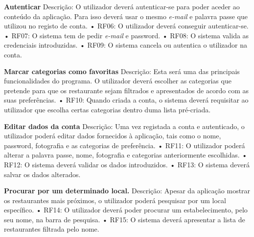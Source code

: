 \documentclass[a4paper,12pt]{scrreprt}
\begin{document}
             
            \textbf{Autenticar} \newline
            Descrição: O utilizador deverá autenticar-se para poder aceder ao conteúdo da aplicação. Para isso deverá usar o mesmo  \textit{e-mail} e palavra passe que utilizou no registo de conta. \newline
            • RF06: O utilizador deverá conseguir autenticar-se.\newline
            • RF07: O sistema tem de pedir \textit{e-mail} e password.\newline
            • RF08: O sistema valida as credenciais introduzidas.\newline
            • RF09: O sistema cancela ou autentica o utilizador na conta.\newline
            
            \textbf{Marcar categorias como favoritas} \newline
            Descrição: Esta será uma das principais funcionalidades do programa. O utilizador deverá escolher as categorias que pretende para que os restaurante sejam filtrados e apresentados de acordo com as suas preferências.\newline
            • RF10: Quando criada a conta, o sistema deverá requisitar ao utilizador que escolha certas categorias dentro duma lista pré-criada.\newline
            
            \textbf{Editar dados da conta} \newline
            Descrição: Uma vez registada a conta e autenticado, o utilizador poderá editar dados fornecidos à aplicação, tais como o nome, password, fotografia e as categorias de preferência. \newline
            • RF11: O utilizador poderá alterar a palavra passe, nome, fotografia e categorias  anteriormente escolhidas.\newline
            • RF12: O sistema deverá validar os dados introduzidos.\newline
            • RF13: O sistema deverá salvar os dados alterados.\newline
            
            \textbf{Procurar por um determinado local.}  \newline
            Descrição: Apesar da aplicação mostrar os restaurantes mais próximos, o utilizador poderá pesquisar por um local específico. \newline
            • RF14: O utilizador deverá poder procurar um estabelecimento, pelo seu nome, na barra de pesquisa.\newline
            • RF15: O sistema deverá apresentar a lista de restaurantes filtrada pelo nome.\newline
            
\end{document}
